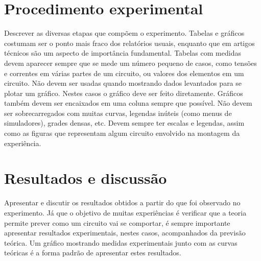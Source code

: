 \documentclass[10pt,conference]{IEEEtran}                      %
\begin{document}
\section{Procedimento experimental}
Descrever as diversas etapas que compõem o experimento. Tabelas e gráficos costumam ser o ponto mais fraco 
dos relatórios usuais, enquanto que em artigos técnicos são um aspecto de importância fundamental. 
Tabelas com medidas devem aparecer sempre que se mede um número pequeno de casos, como tensões e correntes em várias partes de um circuito, ou valores dos elementos em um circuito. Não devem ser usadas quando mostrando dados levantados para se plotar um gráfico. Nestes casos o gráfico deve ser feito diretamente. 
Gráficos também devem ser encaixados em uma coluna sempre que possível. Não devem ser sobrecarregados com muitas curvas, legendas inúteis (como menus de simuladores), grades densas, etc. Devem sempre ter escalas e legendas, assim como as figuras que representam algum circuito envolvido na montagem da experiência.
\section{Resultados e discussão}
Apresentar e discutir os resultados obtidos a partir do que foi observado no experimento. Já que o objetivo de muitas experiências é verificar que a teoria permite prever como um circuito vai se comportar, é sempre importante apresentar resultados experimentais, nestes casos, acompanhados da previsão teórica. Um gráfico mostrando medidas experimentais junto com as curvas teóricas é a forma padrão de apresentar estes resultados.~\cite{itseez2015opencv}
\end{document}

